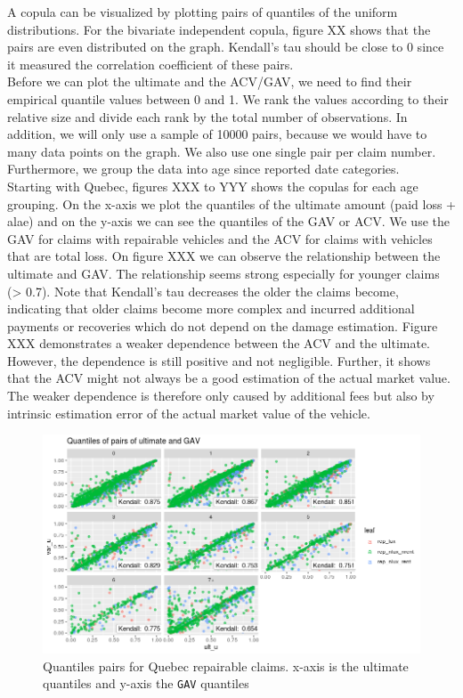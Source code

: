 	A copula can be visualized by plotting pairs of quantiles of the uniform distributions. For the bivariate independent copula, figure XX shows that the pairs are even distributed on the graph. Kendall’s tau should be close to 0 since it measured the correlation coefficient of these pairs. \\
	Before we can plot the ultimate and the ACV/GAV, we need to find their empirical quantile values between 0 and 1. We rank the values according to their relative size and divide each rank by the total number of observations. In addition, we will only use a sample of 10000 pairs, because we would have to many data points on the graph. We also use one single pair per claim number. Furthermore, we group the data into age since reported date categories. \\
	Starting with Quebec, figures XXX to YYY shows the copulas for each age grouping. On the x-axis we plot the quantiles of the ultimate amount (paid loss + alae) and on the y-axis we can see the quantiles of the GAV or ACV. We use the GAV for claims with repairable vehicles and the ACV for claims with vehicles that are total loss. On figure XXX we can observe the relationship between the ultimate and GAV. The relationship seems strong especially for younger claims (> 0.7). Note that Kendall’s tau decreases the older the claims become, indicating that older claims become more complex and incurred additional payments or recoveries which do not depend on the damage estimation. Figure XXX demonstrates a weaker dependence between the ACV and the ultimate. However, the dependence is still positive and not negligible. Further, it shows that the ACV might not always be a good estimation of the actual market value. The weaker dependence is therefore only caused by additional fees but also by intrinsic estimation error of the actual market value of the vehicle. 
	
	\begin{figure}[H]
		\begin{center}
			\includegraphics[scale=0.4]{Graphiques/qc_rep} 
			\renewcommand{\figurename}{Figure}
			\caption{Quantiles pairs for Quebec repairable claims. x-axis is the ultimate quantiles and y-axis the \texttt{GAV} quantiles}\label{Fig_copula_qc_rep}
		\end{center}
	\end{figure}


